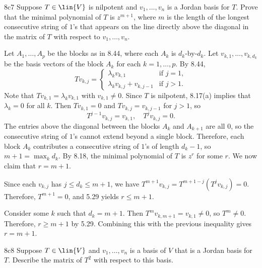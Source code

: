 \begin{exercise}{8c7}
    Suppose $T \in \lin{V}$ is nilpotent and $v_1, \ldots, v_n$ is a Jordan basis for $T$.
    Prove that the minimal polynomial of $T$ is $z^{m+1}$, where $m$ is the length of the longest consecutive string of $1$'s that appears on the line directly above the diagonal in the matrix of $T$ with respect to $v_1, \ldots, v_n$.
\end{exercise}

\begin{sol}
    Let $A_1, \ldots, A_p$ be the blocks as in 8.44, where each $A_k$ is $d_k$-by-$d_k$.
    Let $v_{k, 1}, \ldots, v_{k, d_k}$ be the basis vectors of the block $A_k$ for each $k = 1, \ldots, p$.
    By 8.44,
    \[
        T v_{k, j} =
        \begin{cases}
            \lambda_k v_{k, 1} & \text{if } j = 1, \\
            \lambda_k v_{k, j} + v_{k, j-1} & \text{if } j > 1.
        \end{cases}
    \]
    Note that $T v_{k, 1} = \lambda_k v_{k, 1}$ with $v_{k, 1} \neq 0$.
    Since $T$ is nilpotent, 8.17(a) implies that $\lambda_k = 0$ for all $k$.
    Then $T v_{k, 1} = 0$ and $T v_{k, j} = v_{k, j-1}$ for $j > 1$, so
    \[
        T^{j-1} v_{k, j} = v_{k, 1}, \quad T^j v_{k, j} = 0.
    \]
    The entries above the diagonal between the blocks $A_k$ and $A_{k+1}$ are all $0$, so the consecutive string of $1$'s cannot extend beyond a single block.
    Therefore, each block $A_k$ contributes a consecutive string of $1$'s of length $d_k - 1$, so $m+1 = \max_k d_k$.
    By 8.18, the minimal polynomial of $T$ is $z^r$ for some $r$.
    We now claim that $r = m+1$.

    \rightineq Since each $v_{k, j}$ has $j \leq d_k \leq m+1$, we have $T^{m+1} v_{k, j} = T^{m+1-j}(T^j v_{k, j}) = 0$.
    Therefore, $T^{m+1} = 0$, and 5.29 yields $r \leq m+1$.

    \leftineq Consider some $k$ such that $d_k = m+1$.
    Then $T^m v_{k, m+1} = v_{k, 1} \neq 0$, so $T^m \neq 0$.
    Therefore, $r \geq m+1$ by 5.29.
    Combining this with the previous inequality gives $r = m+1$.
\end{sol}

\begin{exercise}{8c8}
    Suppose $T \in \lin{V}$ and $v_1, \ldots, v_n$ is a basis of $V$ that is a Jordan basis for $T$.
    Describe the matrix of $T^2$ with respect to this basis.
\end{exercise}

